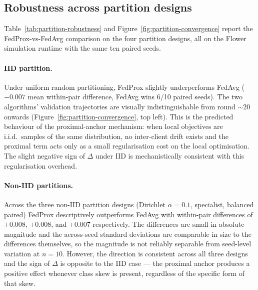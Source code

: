 

\subsection{Robustness across partition designs}
\label{sec:partition-robustness}

Table~\ref{tab:partition-robustness} and
Figure~\ref{fig:partition-convergence} report the FedProx-vs-FedAvg
comparison on the four partition designs, all on the Flower
simulation runtime with the same ten paired seeds.



\paragraph{IID partition.}
Under uniform random partitioning, FedProx slightly underperforms
FedAvg ($-0.007$ mean within-pair difference, FedAvg wins 6/10
paired seeds). The two algorithms' validation trajectories are
visually indistinguishable from round $\sim 20$ onwards
(Figure~\ref{fig:partition-convergence}, top left). This is the
predicted behaviour of the proximal-anchor mechanism: when local
objectives are i.i.d.\ samples of the same distribution, no
inter-client drift exists and the proximal term acts only as a
small regularisation cost on the local optimisation. The slight
negative sign of $\Delta$ under IID is mechanistically consistent
with this regularisation overhead.

\paragraph{Non-IID partitions.}
Across the three non-IID partition designs (Dirichlet
$\alpha = 0.1$, specialist, balanced paired) FedProx descriptively
outperforms FedAvg with within-pair differences of $+0.008$,
$+0.008$, and $+0.007$ respectively. The differences are small in
absolute magnitude and the across-seed standard deviations are
comparable in size to the differences themselves, so the magnitude
is not reliably separable from seed-level variation at $n = 10$.
However, the direction is consistent across all three designs and
the sign of $\Delta$ is opposite to the IID case --- the proximal
anchor produces a positive effect whenever class skew is present,
regardless of the specific form of that skew.

